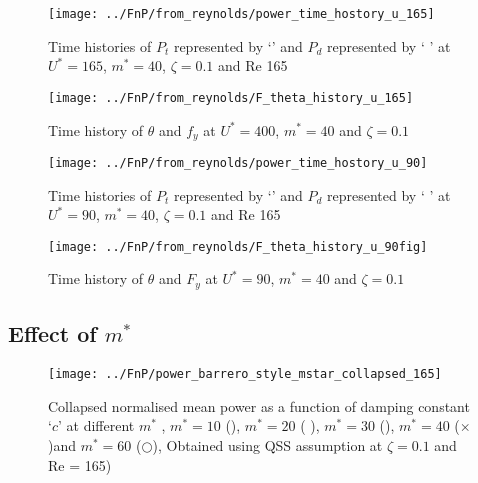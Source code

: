   
  \begin{figure}
  \centering
  \texttt{[image: ../FnP/from\_reynolds/power\_time\_hostory\_u\_165]}
  \caption{Time histories of  $P_t$  represented by `\protect\dashedrule' and $P_d$ represented by ` \solidrule[4mm]\hspace{1mm}' at $U^*=165$, $m^*=40$, $\zeta=0.1$ and Re 165}
  \label{fig:power_time_hostory_u_165}
  \end{figure}
  
  \begin{figure}
  \centering
  \texttt{[image: ../FnP/from\_reynolds/F\_theta\_history\_u\_165]}
  \caption{Time history of $\theta$ and $f_y$ at $U^*=400$, $m^*=40$ and $\zeta=0.1$}
  \label{fig:F_theta_history_u_165}
  \end{figure}
 
 
  \begin{figure}
  \centering
  \texttt{[image: ../FnP/from\_reynolds/power\_time\_hostory\_u\_90]}
  \caption{Time histories of  $P_t$  represented by `\protect\dashedrule' and $P_d$ represented by ` \solidrule[4mm]\hspace{1mm}' at $U^*=90$, $m^*=40$, $\zeta=0.1$ and Re 165 }
  \label{fig:power_time_hostory_u_90}
  \end{figure}
  
  \begin{figure}
  \centering
  \texttt{[image: ../FnP/from\_reynolds/F\_theta\_history\_u\_90fig]}
  \caption{Time history of $\theta$ and $F_y$ at $U^*=90$, $m^*=40$ and $\zeta=0.1$}
  \label{fig:F_theta_history_u_90fig}
  \end{figure}
 
 



\subsection{Effect of $m^*$}

\begin{figure}
\centering
\texttt{[image: ../FnP/power\_barrero\_style\_mstar\_collapsed\_165]}
\caption{Collapsed normalised mean power as a function of damping constant `$c$' at different $m^*$  ,  $m^*=10$ (), $m^*=20$ ( ),  $m^*=30$ (),  $m^*=40$  ($\times$)and   $m^* = 60$ ($\bigcirc$), Obtained using QSS assumption at  $\zeta=0.1$ and Re = 165) } 
\label{fig:power_mstar_collapsed_165}
\end{figure}

